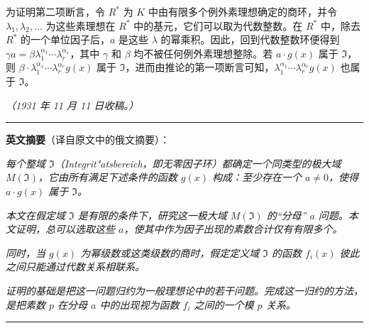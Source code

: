 为证明第二项断言，令 $R^*$ 为 $K$ 中由有限多个例外素理想确定的商环，并令 $\lambda_1,\lambda_2,\ldots$ 为这些素理想在 $R^*$ 中的基元，它们可以取为代数整数。在 $R^*$ 中，除去 $R^*$ 的一个单位因子后，$a$ 是这些 $\lambda$ 的幂乘积。因此，回到代数整数环便得到 $\gamma a = \beta \lambda_1^{\alpha_1} \cdots \lambda_r^{\alpha_r}$，其中 $\gamma$ 和 $\beta$ 均不被任何例外素理想整除。若 $a \cdot g(x)$ 属于 $\mathfrak{I}$，则 $\beta \cdot \lambda_1^{\alpha_1} \cdots \lambda_r^{\alpha_r} g(x)$ 属于 $\mathfrak{I}$，进而由推论的第一项断言可知，$\lambda_1^{\alpha_1} \cdots \lambda_r^{\alpha_r} g(x)$ 也属于 $\mathfrak{I}$。

\medskip
\hfill\textit{（1931 年 11 月 11 日收稿。）}

\bigskip
\noindent\rule{\textwidth}{0.4pt}

\medskip
\noindent\textbf{英文摘要}（译自原文中的俄文摘要）：

\smallskip
\textit{每个整域 $\mathfrak{I}$（Integrit"atsbereich，即无零因子环）都确定一个同类型的极大域 $M(\mathfrak{I})$，它由所有满足下述条件的函数 $g(x)$ 构成：至少存在一个 $a \neq 0$，使得 $a \cdot g(x)$ 属于 $\mathfrak{I}$。}

\textit{本文在假定域 $\mathfrak{I}$ 是有限的条件下，研究这一极大域 $M(\mathfrak{I})$ 的“分母” $a$ 问题。本文证明，总可以选取这些 $a$，使其中作为因子出现的素数合计仅有有限多个。}

\textit{同时，当 $g(x)$ 为幂级数或这类级数的商时，假定定义域 $\mathfrak{I}$ 的函数 $f_i(x)$ 彼此之间只能通过代数关系相联系。}

\textit{证明的基础是把这一问题归约为一般理想论中的若干问题。完成这一归约的方法，是把素数 $p$ 在分母 $a$ 中的出现视为函数 $f_i$ 之间的一个模 $p$ 关系。}


\medskip
\noindent\rule{\textwidth}{0.4pt}

